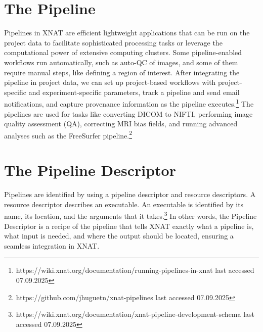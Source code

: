 \section{The Pipeline}
Pipelines in XNAT are efficient lightweight applications that can be run on the project data to facilitate sophisticated processing tasks or leverage the computational power of extensive computing clusters. Some pipeline-enabled workflows run automatically, such as auto-QC of images, and some of them require manual steps, like defining a region of interest. After integrating the pipeline in project data, we can set up project-based workflows with project-specific and experiment-specific parameters, track a pipeline and send email notifications, and capture provenance information as the pipeline executes.\footnote{https://wiki.xnat.org/documentation/running-pipelines-in-xnat {last accessed 07.09.2025}} The pipelines are used for tasks like converting DICOM to NIFTI, performing image quality assessment (QA), correcting MRI bias fields, and running advanced analyses such as the FreeSurfer pipeline.\footnote{https://github.com/jhuguetn/xnat-pipelines {last accessed 07.09.2025}}

\section{The Pipeline Descriptor}

Pipelines are identified by using a pipeline descriptor and resource descriptors. A resource descriptor describes an executable. An executable is identified by its name, its location, and the arguments that it takes.\footnote{https://wiki.xnat.org/documentation/xnat-pipeline-development-schema {last accessed 07.09.2025}} In other words, the Pipeline Descriptor is a recipe of the pipeline that tells XNAT exactly what a pipeline is, what input is needed, and where the output should be located, ensuring a seamless integration in XNAT.








